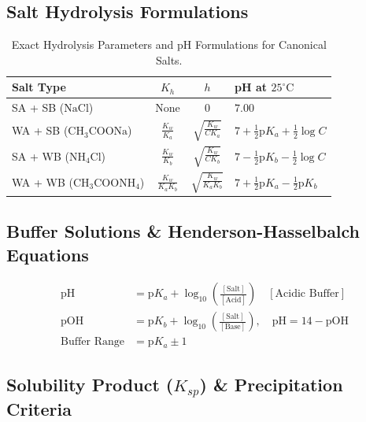 \documentclass[10pt,twoside,openright]{book}
\begin{document}
\subsection{Salt Hydrolysis Formulations}

\begin{table}[htbp]
\centering
\small
\renewcommand{\arraystretch}{1.3}
{\fontsize{7.5pt}{9.0pt}\selectfont\setlength{\tabcolsep}{1.5pt}
\begin{tabularx}{\linewidth}{l c c >{\RaggedRight}X}
\toprule
\textbf{Salt Type} & \textbf{$K_h$} & \textbf{$h$} & \textbf{pH at $25^\circ\text{C}$} \\
\midrule
SA + SB ($\text{NaCl}$) & None & $0$ & $7.00$ \\
WA + SB ($\text{CH}_3\text{COONa}$) & $\frac{K_w}{K_a}$ & $\sqrt{\frac{K_w}{C K_a}}$ & $7 + \frac{1}{2}\text{p}K_a + \frac{1}{2}\log C$ \\
SA + WB ($\text{NH}_4\text{Cl}$) & $\frac{K_w}{K_b}$ & $\sqrt{\frac{K_w}{C K_b}}$ & $7 - \frac{1}{2}\text{p}K_b - \frac{1}{2}\log C$ \\
WA + WB ($\text{CH}_3\text{COONH}_4$) & $\frac{K_w}{K_a K_b}$ & $\sqrt{\frac{K_w}{K_a K_b}}$ & $7 + \frac{1}{2}\text{p}K_a - \frac{1}{2}\text{p}K_b$ \\
\bottomrule
\end{tabularx}}
\caption{Exact Hydrolysis Parameters and pH Formulations for Canonical Salts.}
\end{table}

\subsection{Buffer Solutions \& Henderson-Hasselbalch Equations}

\begin{formulabox}
\begin{align}
  \text{pH} &= \text{p}K_a + \log_{10}\left(\frac{[\text{Salt}]}{[\text{Acid}]}\right) \quad [\text{Acidic Buffer}] \\
  \text{pOH} &= \text{p}K_b + \log_{10}\left(\frac{[\text{Salt}]}{[\text{Base}]}\right), \quad \text{pH} = 14 - \text{pOH} \\
  \text{Buffer Range} &= \text{p}K_a \pm 1
\end{align}
\end{formulabox}

\subsection{Solubility Product ($K_{sp}$) \& Precipitation Criteria}
\end{document}
